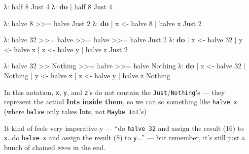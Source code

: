 \documentclass[]{article}
\newenvironment{Shaded}{}{}
\newcommand{\KeywordTok}[1]{\textcolor[rgb]{0.00,0.44,0.13}{\textbf{{#1}}}}
\newcommand{\DataTypeTok}[1]{\textcolor[rgb]{0.56,0.13,0.00}{{#1}}}
\newcommand{\DecValTok}[1]{\textcolor[rgb]{0.25,0.63,0.44}{{#1}}}
\newcommand{\OtherTok}[1]{\textcolor[rgb]{0.00,0.44,0.13}{{#1}}}
\newcommand{\FunctionTok}[1]{\textcolor[rgb]{0.02,0.16,0.49}{{#1}}}
\newcommand{\NormalTok}[1]{{#1}}
\begin{document}
\begin{Shaded}
\begin{Highlighting}[]
\NormalTok{λ}\FunctionTok{:} \NormalTok{half }\DecValTok{8}
\DataTypeTok{Just} \DecValTok{4}
\NormalTok{λ}\FunctionTok{:} \KeywordTok{do}
 \FunctionTok{|}     \NormalTok{half }\DecValTok{8}
\DataTypeTok{Just} \DecValTok{4}

\NormalTok{λ}\FunctionTok{:} \NormalTok{halve }\DecValTok{8} \FunctionTok{>>=} \NormalTok{halve}
\DataTypeTok{Just} \DecValTok{2}
\NormalTok{λ}\FunctionTok{:} \KeywordTok{do}
 \FunctionTok{|}     \NormalTok{x }\OtherTok{<-} \NormalTok{halve }\DecValTok{8}
 \FunctionTok{|}     \NormalTok{halve x}
\DataTypeTok{Just} \DecValTok{2}

\NormalTok{λ}\FunctionTok{:} \NormalTok{halve }\DecValTok{32} \FunctionTok{>>=} \NormalTok{halve }\FunctionTok{>>=} \NormalTok{halve }\FunctionTok{>>=} \NormalTok{halve}
\DataTypeTok{Just} \DecValTok{2}
\NormalTok{λ}\FunctionTok{:} \KeywordTok{do}
 \FunctionTok{|}     \NormalTok{x }\OtherTok{<-} \NormalTok{halve }\DecValTok{32}
 \FunctionTok{|}     \NormalTok{y }\OtherTok{<-} \NormalTok{halve x}
 \FunctionTok{|}     \NormalTok{z }\OtherTok{<-} \NormalTok{halve y}
 \FunctionTok{|}     \NormalTok{halve z}
\DataTypeTok{Just} \DecValTok{2}

\NormalTok{λ}\FunctionTok{:} \NormalTok{halve }\DecValTok{32} \FunctionTok{>>} \DataTypeTok{Nothing} \FunctionTok{>>=} \NormalTok{halve }\FunctionTok{>>=} \NormalTok{halve}
\DataTypeTok{Nothing}
\NormalTok{λ}\FunctionTok{:} \KeywordTok{do}
 \FunctionTok{|}     \NormalTok{x }\OtherTok{<-} \NormalTok{halve }\DecValTok{32}
 \FunctionTok{|}     \DataTypeTok{Nothing}
 \FunctionTok{|}     \NormalTok{y }\OtherTok{<-} \NormalTok{halve x}
 \FunctionTok{|}     \NormalTok{z }\OtherTok{<-} \NormalTok{halve y}
 \FunctionTok{|}     \NormalTok{halve z}
\DataTypeTok{Nothing}
\end{Highlighting}
\end{Shaded}

In this notation, \texttt{x}, \texttt{y}, and \texttt{z}'s do not contain the
\texttt{Just}/\texttt{Nothing}'s --- they represent the actual \textbf{Ints inside them}, so we can
so something like \texttt{halve\ x} (where \texttt{halve} only takes Ints, not
\texttt{Maybe\ Int}'s)

It kind of feels very imperative-y --- ``do \texttt{halve\ 32} and assign the result (16) to
\texttt{x}\ldots{}do \texttt{halve\ x} and assign the result (8) to \texttt{y}\ldots{}'' --- but
remember, it's still just a bunch of chained \texttt{\textgreater{}\textgreater{}=}s in the end.
\end{document}

